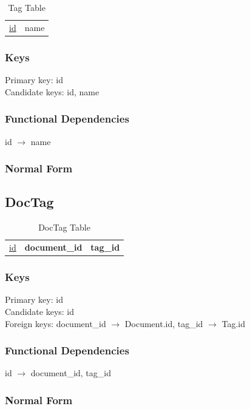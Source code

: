 \documentclass[11pt]{article}
\begin{document}
\begin{table}[htb]
\caption{Tag Table} 
\begin{center}
\begin{tabular}{ll}
 \underline{id}  &  name  \\
\end{tabular}
\end{center}
\end{table}
\subsubsection{Keys}
\label{sec-3-10-1}

    
    Primary key: id\\
    Candidate keys: id, name
\subsubsection{Functional Dependencies}
\label{sec-3-10-2}


    id $\rightarrow$ name
\subsubsection{Normal Form}
\label{sec-3-10-3}
\subsection{DocTag}
\label{sec-3-11}


\begin{table}[htb]
\caption{DocTag Table} 
\begin{center}
\begin{tabular}{lll}
 \underline{id}  &  \textbf{document\_id}  &  \textbf{tag\_id}  \\
\end{tabular}
\end{center}
\end{table}

   
\subsubsection{Keys}
\label{sec-3-11-1}

    
    Primary key: id\\
    Candidate keys: id\\
    Foreign keys: document\_id $\rightarrow$ Document.id, tag\_id $\rightarrow$ Tag.id
\subsubsection{Functional Dependencies}
\label{sec-3-11-2}

    
    id $\rightarrow$ document\_id, tag\_id
\subsubsection{Normal Form}
\label{sec-3-11-3}
\end{document}
